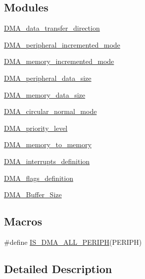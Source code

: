\subsection*{Modules}
\begin{DoxyCompactItemize}
\item 
\hyperlink{group___d_m_a__data__transfer__direction}{D\+M\+A\+\_\+data\+\_\+transfer\+\_\+direction}
\item 
\hyperlink{group___d_m_a__peripheral__incremented__mode}{D\+M\+A\+\_\+peripheral\+\_\+incremented\+\_\+mode}
\item 
\hyperlink{group___d_m_a__memory__incremented__mode}{D\+M\+A\+\_\+memory\+\_\+incremented\+\_\+mode}
\item 
\hyperlink{group___d_m_a__peripheral__data__size}{D\+M\+A\+\_\+peripheral\+\_\+data\+\_\+size}
\item 
\hyperlink{group___d_m_a__memory__data__size}{D\+M\+A\+\_\+memory\+\_\+data\+\_\+size}
\item 
\hyperlink{group___d_m_a__circular__normal__mode}{D\+M\+A\+\_\+circular\+\_\+normal\+\_\+mode}
\item 
\hyperlink{group___d_m_a__priority__level}{D\+M\+A\+\_\+priority\+\_\+level}
\item 
\hyperlink{group___d_m_a__memory__to__memory}{D\+M\+A\+\_\+memory\+\_\+to\+\_\+memory}
\item 
\hyperlink{group___d_m_a__interrupts__definition}{D\+M\+A\+\_\+interrupts\+\_\+definition}
\item 
\hyperlink{group___d_m_a__flags__definition}{D\+M\+A\+\_\+flags\+\_\+definition}
\item 
\hyperlink{group___d_m_a___buffer___size}{D\+M\+A\+\_\+\+Buffer\+\_\+\+Size}
\end{DoxyCompactItemize}
\subsection*{Macros}
\begin{DoxyCompactItemize}
\item 
\#define \hyperlink{group___d_m_a___exported___constants_gabcab9fa1c48b148703a8f41c1d99e0c8}{I\+S\+\_\+\+D\+M\+A\+\_\+\+A\+L\+L\+\_\+\+P\+E\+R\+I\+PH}(P\+E\+R\+I\+PH)
\end{DoxyCompactItemize}


\subsection{Detailed Description}


